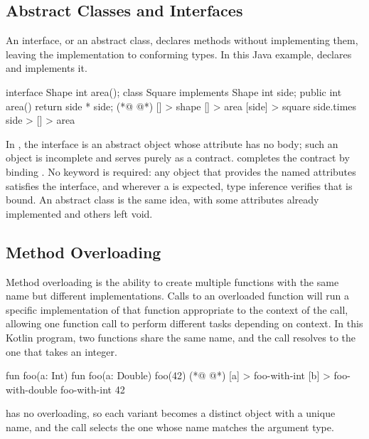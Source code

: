 \subsection{Abstract Classes and Interfaces}
\label{sec:abstract}

An interface, or an abstract class, declares methods without implementing
  them, leaving the implementation to conforming types.
In this Java example,  declares  and 
  implements it.

\begin{ffcode}
interface Shape {
  int area();
}
class Square implements Shape {
  int side;
  public int area() {
    return side * side;
  }
}
(*@ \ffcolumnbreak @*)
[] > shape
  [] > area
[side] > square
  side.times side > [] > area
\end{ffcode}

In \eolang{}, the interface  is an abstract object whose 
  attribute has no body; such an object is incomplete and serves purely
  as a contract.
 completes the contract by binding .
No  keyword is required: any object that provides the named
  attributes satisfies the interface, and wherever a  is expected,
  type inference verifies that  is bound.
An abstract class is the same idea, with some attributes already
  implemented and others left void.

\subsection{Method Overloading}
\label{sec:overloading}

Method overloading is the ability to create multiple functions with
  the same name but different implementations.
Calls to an overloaded function will run a specific implementation
  of that function appropriate to the context of the call,
  allowing one function call to perform different tasks depending on context.
In this Kotlin program, two functions share the same name,
  and the call  resolves to the one that takes an integer.

\begin{ffcode}
fun foo(a: Int) {}
fun foo(a: Double) {}
foo(42)
(*@ \ffcolumnbreak @*)
[a] > foo-with-int
[b] > foo-with-double
foo-with-int 42
\end{ffcode}

\eolang{} has no overloading, so each variant becomes a distinct object
  with a unique name, and the call selects the one whose name matches
  the argument type.

